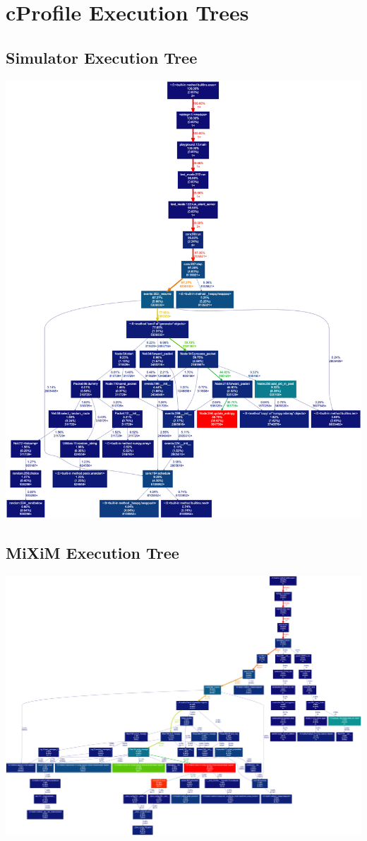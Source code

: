 \documentclass[logo,msc,cyber]{infthesis}   %
\begin{document}
\chapter{cProfile Execution Trees}

\section{Simulator Execution Tree}
\label{appendix:b1}
\includegraphics[width=\textwidth]{images/cprofile_simulator.png}

\section{MiXiM Execution Tree}
\label{appendix:b2}
\includegraphics[width=\textwidth]{images/cprofile_mixim.png}
\end{document}
